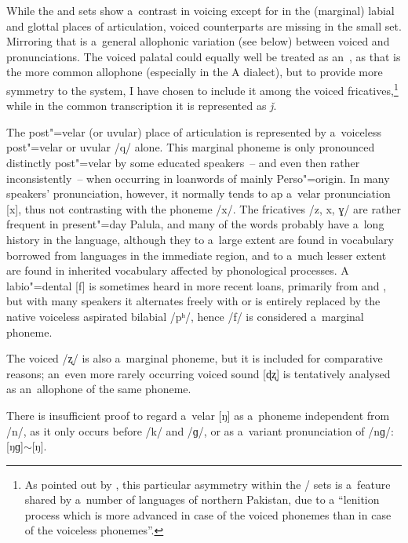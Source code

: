 While the  and  sets show a~contrast in voicing except for in the (marginal) labial and glottal places of articulation, voiced counterparts are missing in the small  set. Mirroring that is a~general allophonic variation (see below) between voiced  and  pronunciations. The voiced palatal  could equally well be treated as an~, as that is the more common allophone (especially in the A dialect), but to provide more symmetry to the system, I have chosen to include it among the voiced fricatives,\footnote{As pointed out by \citet[34]{zoller2005}, this particular asymmetry within the / sets is a~feature shared by a~number of languages of northern Pakistan, due to a ``lenition process which is more advanced in case of the voiced phonemes than in case of the voiceless phonemes''.} while in the common transcription it is represented as \textit{ǰ}.


The post"=velar (or uvular) place of articulation is represented by a~voiceless post"=velar or uvular  /q/ alone. This marginal phoneme is only pronounced distinctly post"=velar by some educated speakers~-- and even then rather inconsistently~-- when occurring in loanwords of mainly Perso"=\iliArabic origin. In many speakers' pronunciation, however, it normally tends to ap a~velar  pronunciation [x], thus not contrasting with the phoneme /x/. The fricatives /z, x, ɣ/ are rather frequent in present"=day Palula, and many of the words probably have a~long history in the language, although they to a~large extent are found in vocabulary borrowed from languages in the immediate region, and to a~much lesser extent are found in inherited vocabulary affected by phonological processes. A labio"=dental [f] is sometimes heard in more recent loans, primarily from \iliUrdu and \iliEnglish, but with many speakers it alternates freely with or is entirely replaced by the native voiceless aspirated bilabial  /pʰ/, hence /f/ is considered a~marginal phoneme. 


The voiced   /ʐ/ is also a~marginal phoneme, but it is included for comparative reasons; an~even more rarely occurring voiced   sound [ɖʐ] is tentatively analysed as an~allophone of the same phoneme. 


There is insufficient proof to regard a~velar  [ŋ] as a~phoneme independent from /n/, as it only occurs before /k/ and /ɡ/, or as a~variant pronunciation of /nɡ/: [ŋɡ]$\sim$[ŋ]. 


